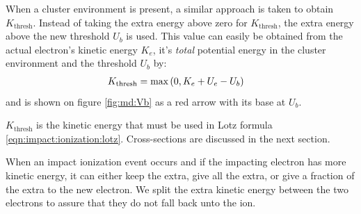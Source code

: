 When a cluster environment is present, a similar approach is taken to obtain
$K_{\textrm{thresh}}$. Instead of taking the extra energy above zero for
$K_{\textrm{thresh}}$, the extra energy above the new threshold $U_b$ is used.
This value can easily be obtained from the actual electron's kinetic energy
$K_e$, it's \textit{total} potential energy in the cluster environment and the
threshold $U_b$ by:
\begin{align}
K_{\textrm{thresh}} & = \textrm{max}\left( 0, K_e + U_e - U_b \right)
\label{eqn:md:kthresh}
\end{align}
and is shown on figure \ref{fig:md:Vb} as a red arrow with its base at $U_b$.


$K_{\textrm{thresh}}$ is the kinetic energy that must be used in Lotz formula
\eqref{eqn:impact:ionization:lotz}. Cross-sections are discussed in the next
section.


When an impact ionization event occurs and if the impacting electron has more kinetic
energy, it can either keep the extra, give all the extra, or give a fraction of
the extra to the new electron. We split the extra kinetic energy between the two
electrons to assure that they do not fall back unto the ion.


%


